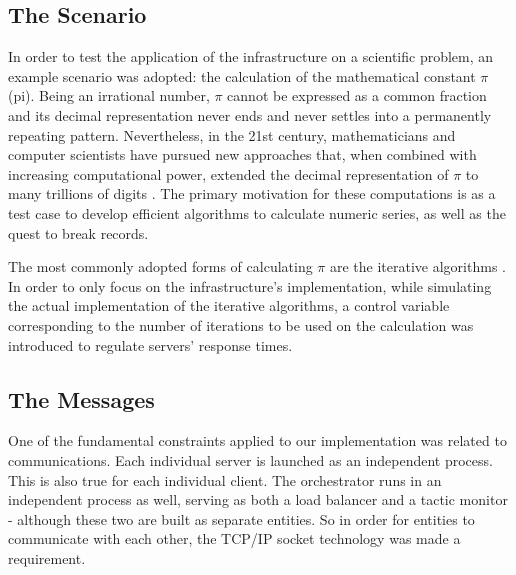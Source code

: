 \documentclass[12pt]{article}
\begin{document}
\subsection{The Scenario} \label{scenario} %

In order to test the application of the infrastructure on a scientific problem, an example scenario was adopted: the calculation of the mathematical constant $\pi$ (pi).
Being an irrational number, $\pi$ cannot be expressed as a common fraction and its decimal representation never ends and never settles into a permanently repeating pattern.
Nevertheless, in the 21st century, mathematicians and computer scientists have pursued new approaches that, when combined with increasing computational power,
extended the decimal representation of $\pi$ to many trillions of digits \cite{pisky}.
The primary motivation for these computations is as a test case to develop efficient algorithms to calculate numeric series, as well as the quest to break records.

The most commonly adopted forms of calculating $\pi$ are the iterative algorithms \cite{jorg}.
In order to only focus on the infrastructure's implementation, while simulating the actual implementation of the iterative algorithms, a control variable
corresponding to the number of iterations to be used on the calculation was introduced to regulate servers' response times.

\subsection{The Messages} \label{messages} %

One of the fundamental constraints applied to our implementation was related to communications.
Each individual server is launched as an independent process.
This is also true for each individual client.
The orchestrator runs in an independent process as well, serving as both a load balancer and a tactic monitor - although these two are built as separate entities.
So in order for entities to communicate with each other, the TCP/IP socket technology was made a requirement.
\end{document}
